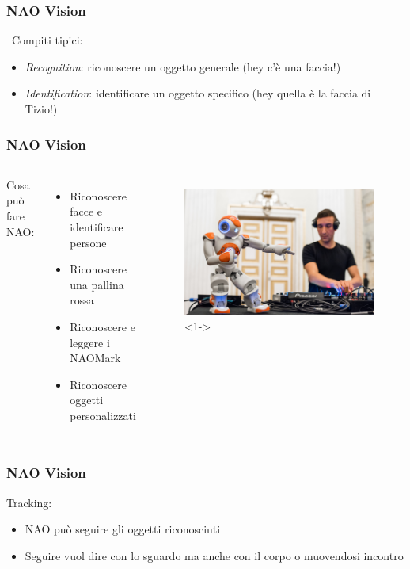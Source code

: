\documentclass[aspectratio=169]{beamer}
\begin{document}
\begin{frame}
\frametitle{NAO Vision}\
Compiti tipici:
\begin{itemize}
	\item<2-> \textit{Recognition}: riconoscere un oggetto generale (hey c'è una faccia!)
	\item<3-> \textit{Identification}: identificare un oggetto specifico (hey quella è la faccia di Tizio!)
\end{itemize}
\end{frame}

\begin{frame}
\frametitle{NAO Vision}
\begin{columns}
		Cosa può fare NAO:
		\begin{itemize}
			\item<2-> Riconoscere facce e identificare persone
			\item<3-> Riconoscere una pallina rossa
			\item<4-> Riconoscere e leggere i NAOMark
			\item<5-> Riconoscere oggetti personalizzati
		\end{itemize}
		\begin{figure}[ht]
		\begin{center}
		\includegraphics[width=.9\textwidth]{nao7}<1->
		\end{center}
		\end{figure}
	\end{columns}
\end{frame}

\begin{frame}
\frametitle{NAO Vision}
Tracking:
\begin{itemize}
	\item<2-> NAO può seguire gli oggetti riconosciuti
	\item<3-> Seguire vuol dire con lo sguardo ma anche con il corpo o muovendosi incontro
\end{itemize}
\end{frame}

\ifx\fulldocument\undefined
\end{document}
